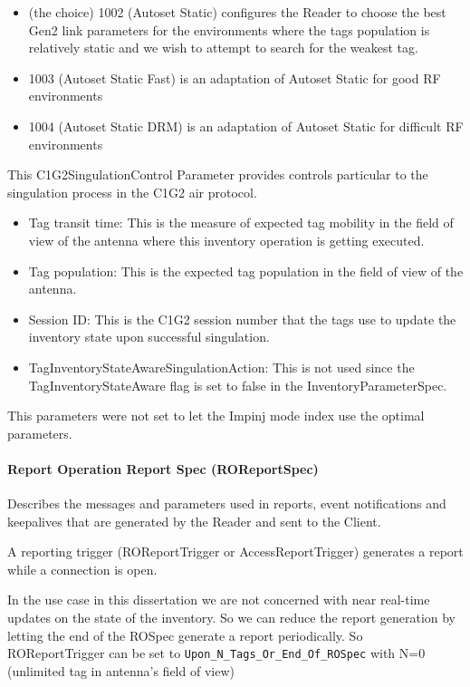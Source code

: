 \begin{itemize}
    \item (the choice) 1002 (Autoset Static) configures the Reader to choose the best Gen2 link parameters for the environments where the tags population is relatively static and we wish to attempt to search for the weakest tag.
    \item 1003 (Autoset Static Fast) is an adaptation of Autoset Static for good RF environments
    \item 1004 (Autoset Static DRM) is an adaptation of Autoset Static for difficult RF environments
\end{itemize}

This C1G2SingulationControl Parameter provides controls particular to the singulation process in the C1G2 air protocol.

\begin{itemize}
    \item Tag transit time: This is the measure of expected tag mobility in the field of view of the antenna where this inventory operation is getting executed.
    \item Tag population: This is the expected tag population in the field of view of the antenna.
    \item Session ID: This is the C1G2 session number that the tags use to update the inventory state upon successful singulation.
    \item  TagInventoryStateAwareSingulationAction: This is not used since the TagInventoryStateAware flag is set to false in the InventoryParameterSpec.
\end{itemize}

This parameters were not set to let the Impinj mode index use the optimal parameters.

\paragraph{Report Operation Report Spec (ROReportSpec)}

Describes the messages and parameters used in reports, event notifications and keepalives that are generated by the Reader and sent to the Client.

A reporting trigger (ROReportTrigger or AccessReportTrigger) generates a report while a connection is open.

In the use case in this dissertation we are not concerned with near real-time updates on the state of the inventory. So we can reduce the report generation by letting the end of the ROSpec generate a report periodically.
So ROReportTrigger can be set to \texttt{Upon\_N\_Tags\_Or\_End\_Of\_ROSpec} with N=0 (unlimited tag in antenna's field of view)~\cite[sec. 14.2.1]{LowLevelReader}

